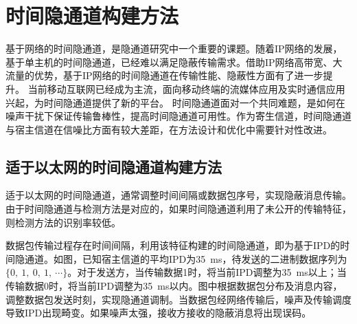 \section{时间隐通道构建方法}
\label{chap:backinfo:ctc}

基于网络的时间隐通道，是隐通道研究中一个重要的课题。随着IP网络的发展，基于单主机的时间隐通道，已经难以满足隐蔽传输需求。借助IP网络高带宽、大流量的优势，基于IP网络的时间隐通道在传输性能、隐蔽性方面有了进一步提升。
当前移动互联网已经成为主流，面向移动终端的流媒体应用及实时通信应用兴起，为时间隐通道提供了新的平台。
时间隐通道面对一个共同难题，是如何在噪声干扰下保证传输鲁棒性，提高时间隐通道可用性。作为寄生信道，时间隐通道与宿主信道在信噪比方面有较大差距，在方法设计和优化中需要针对性改进。

\subsection{适于以太网的时间隐通道构建方法}
\label{chap:backinfo:ctc:ethernet}
适于以太网的时间隐通道，通常调整时间间隔或数据包序号，实现隐蔽消息传输。由于时间隐通道与检测方法是对应的，如果时间隐通道利用了未公开的传输特征，则检测方法的识别率较低。


数据包传输过程存在时间间隔，利用该特征构建的时间隐通道，即为基于IPD的时间隐通道。如图，已知宿主信道的平均IPD为{35\ ms}，待发送的二进制数据序列为$\{0,\ 1,\ 0,\ 1,\ \cdots\}$。对于发送方，当传输数据1时，将当前IPD调整为{35\ ms}以上；当传输数据0时，将当前IPD调整为{35\ ms}以内。图中根据数据包分布及消息内容，调整数据包发送时刻，实现隐通道调制。当数据包经网络传输后，噪声及传输调度导致IPD出现畸变。如果噪声太强，接收方接收的隐蔽消息将出现误码。

